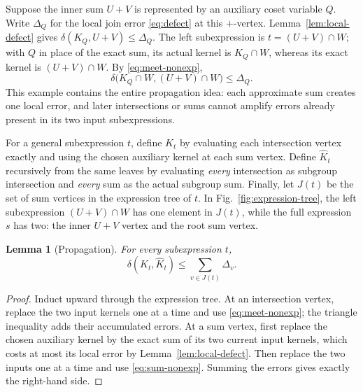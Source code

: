 \documentclass[journal]{IEEEtran}
\newtheorem{lemma}[theorem]{Lemma}
\begin{document}
Suppose the inner sum $U+V$ is represented by an auxiliary coset variable $Q$.
Write $\Delta_Q$ for the local join error \eqref{eq:defect} at this $+$-vertex.
Lemma~\ref{lem:local-defect} gives
$\delta(K_Q,U+V)\le\Delta_Q$.  The left subexpression is
$t=(U+V)\cap W$; with $Q$ in place of the exact sum, its actual kernel is
$K_Q\cap W$, whereas its exact kernel is $(U+V)\cap W$.  By
\eqref{eq:meet-nonexp},
\[
 \delta\bigl(K_Q\cap W,(U+V)\cap W\bigr)\le\Delta_Q.
\]
This example contains the entire propagation idea: each approximate sum
creates one local error, and later intersections or sums cannot amplify errors
already present in its two input subexpressions.

For a general subexpression $t$, define $K_t$ by evaluating each intersection
vertex exactly and using the chosen auxiliary kernel at each sum vertex.  Define
$\widehat K_t$ recursively from the same leaves by evaluating \emph{every}
intersection as subgroup intersection and \emph{every} sum as the actual
subgroup sum.  Finally, let $J(t)$ be the set of sum vertices in the expression
tree of $t$.  In Fig.~\ref{fig:expression-tree}, the left subexpression
$(U+V)\cap W$ has one element in $J(t)$, while the full expression $s$ has two:
the inner $U+V$ vertex and the root sum vertex.

\begin{lemma}[Propagation]\label{lem:propagation}
For every subexpression $t$,
\[
  \delta(K_t,\widehat K_t)\le\sum_{v\in J(t)}\Delta_v.
\]
\end{lemma}
\begin{proof}
Induct upward through the expression tree.  At an intersection vertex, replace
the two input kernels one at a time and use \eqref{eq:meet-nonexp}; the triangle
inequality adds their accumulated errors.  At a sum vertex, first replace the
chosen auxiliary kernel by the exact sum of its two current input kernels,
which costs at most its local error by Lemma~\ref{lem:local-defect}.  Then
replace the two inputs one at a time and use \eqref{eq:sum-nonexp}.  Summing the
errors gives exactly the right-hand side.
\end{proof}
\end{document}

